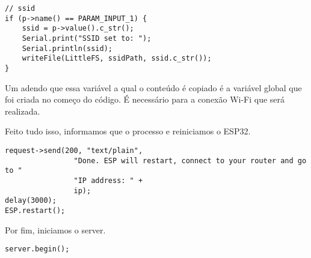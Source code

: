 \begin{lstlisting}
// ssid
if (p->name() == PARAM_INPUT_1) {
    ssid = p->value().c_str();
    Serial.print("SSID set to: ");
    Serial.println(ssid);
    writeFile(LittleFS, ssidPath, ssid.c_str());
}
\end{lstlisting}

Um adendo que essa variável a qual o conteúdo é copiado é a variável global que foi criada no começo do código. É necessário para a conexão Wi-Fi que será realizada.

Feito tudo isso, informamos que o processo e reiniciamos o ESP32.

\begin{lstlisting}
request->send(200, "text/plain",
                "Done. ESP will restart, connect to your router and go to "
                "IP address: " +
                ip);
delay(3000);
ESP.restart();
\end{lstlisting}

Por fim, iniciamos o server.

\begin{lstlisting}
server.begin();
\end{lstlisting}